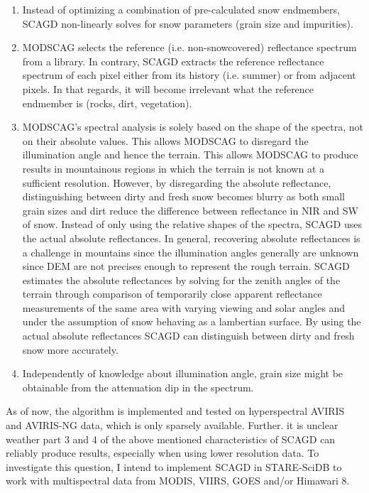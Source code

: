 \documentclass[a4paper,10pt]{article}
\begin{document}
\begin{enumerate}

 \item Instead of optimizing a combination of pre-calculated snow endmembers, \gls{SCAGD} non-linearly solves for snow parameters (grain size and impurities). 
 
 \item \gls{MODSCAG} selects the reference (i.e. non-snowcovered) reflectance spectrum from a library. In contrary, \gls{SCAGD} extracts the reference reflectance spectrum of each pixel either from its history (i.e. summer) or from adjacent pixels. In that regards, it will become irrelevant what the reference endmember is (rocks, dirt, vegetation).  
 
 \item \gls{MODSCAG}'s spectral analysis is solely based on the shape of the spectra, not on their absolute values. This allows \gls{MODSCAG} to disregard the illumination angle and hence the terrain. This allows \gls{MODSCAG} to produce results in mountainous regions in which the terrain is not known at a sufficient resolution. 
 However, by disregarding the absolute reflectance, distinguishing between dirty and fresh snow becomes blurry as both small grain sizes and dirt reduce the difference between reflectance in \gls{NIR} and \gls{SW} of snow.  
 Instead of only using the relative shapes of the spectra, \gls{SCAGD} uses the actual absolute reflectances. In general, recovering absolute reflectances is a challenge in mountains since the illumination angles generally are unknown since \gls{DEM} are not precises enough to represent the rough terrain. 
 \gls{SCAGD} estimates the absolute reflectances by solving for the zenith angles of the terrain through comparison of temporarily close apparent reflectance measurements of the same area with varying viewing and solar angles and under the assumption of snow behaving as a lambertian surface.
 By using the actual absolute reflectances \gls{SCAGD} can distinguish between dirty and fresh snow more accurately.
 
 \item Independently of knowledge about illumination angle, grain size might be obtainable from the attenuation dip in the spectrum. 
 
\end{enumerate}

 
As of now, the algorithm is implemented and tested on hyperspectral \gls{AVIRIS} and \gls{AVIRIS-NG} data, which is only sparsely available. Further. it is unclear weather part 3 and 4 of the above mentioned characteristics of \gls{SCAGD} can reliably produce results, especially when using lower resolution data. To investigate this question, I intend to implement \gls{SCAGD} in STARE-SciDB to work with multispectral data from \gls{MODIS}, \gls{VIIRS}, \gls{GOES} and/or Himawari 8.
\end{document}
